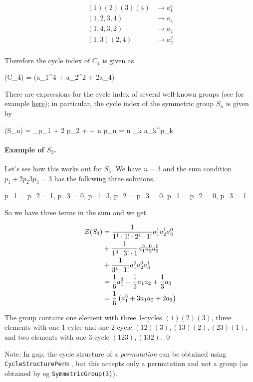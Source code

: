 \begin{align*}
  (1)(2)(3)(4) &\rightarrow a_1^4 \\
  (1,2,3,4)  &\rightarrow a_4 \\
  (1,4,3,2)  &\rightarrow a_4 \\
  (1,3)(2,4) &\rightarrow a_2^2 \\
\end{align*}

Therefore the cycle index of $C_4$ is given as

\bee
\Zc(C_4) =  (a_1^4 + a_2^2 + 2a_4)
\eee

There are expressions for the cycle index of several well-known groups (see for example \href{https://en.wikipedia.org/wiki/Cycle_index}{here}); in particular, the cycle index of the symmetric group $S_n$ is given by

\bee
\Zc(S_n) = \sum_{p_1 + 2 p_2 + \cdots + n p_n = n}  \prod_k a_k^{p_k}
\eee

\paragraph{Example of $S_3$.} Let's see how this works out for $S_3$. We have $n=3$ and the sum condition $p_1 + 2 p_2 3 p_3 = 3$ has the following three solutions,

\bee
p_1 = p_2 = 1, p_3 = 0, \quad p_1=3, p_2 = p_3 = 0, \quad p_1 = p_2 = 0, p_3 = 1
\bee

So we have three terms in the sum and we get

\begin{align*}
  \Zc(S_3) &= \frac{1}{1^1 \cdot 1! \cdot 2^1 \cdot 1!} a_1^1 a_2^1 a_3^0 \\
           &+ \frac{1}{1^3 \cdot 3! \cdot 1} a_1^3 a_2^0 a_3^0 \\
           &+ \frac{1}{3^1 \cdot 1!} a_1^0 a_2^0 a_3^1 \\
           &= \frac{1}{6} a_1^3 + \frac{1}{2} a_1 a_2 + \frac{1}{3} a_3 \\
           &= \frac{1}{6} \left(a_1^3 + 3 a_1 a_2 + 2 a_3 \right)
\end{align*}


The group contains one element with three 1-cycles $(1)(2)(3)$, three elements with one 1-cylce and one 2-cycle $(12)(3), (13)(2), (23)(1)$, and two elements with one 3-cycle $(123),(132)$. \qed

Note: In gap, the cycle structure of a \emph{permutation} can be obtained using\\ \verb+CycleStructurePerm+ , but this accepts only a permutation and not a group (as obtained by eg \verb+SymmetricGroup(3)+).


